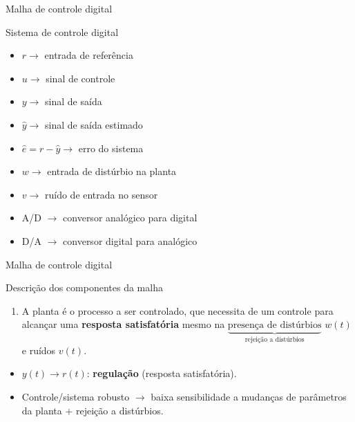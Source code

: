 \begin{frame}{Malha de controle digital}
\begin{block}{Sistema de controle digital}
\begin{itemize}
	\item $ r \rightarrow$ entrada de referência
	\item $ u \rightarrow$ sinal de controle
	\item $ y \rightarrow$ sinal de saída
	\item $ \hat{y} \rightarrow$ sinal de saída estimado
	\item $ \hat{e}=r-\hat{y} \rightarrow$ erro do sistema
	\item $ w \rightarrow$ entrada de distúrbio na planta
	\item $ v \rightarrow$ ruído de entrada no sensor
	\item A/D $ \rightarrow$ conversor analógico para digital
	\item D/A $ \rightarrow$ conversor digital para analógico
\end{itemize}
\end{block}
\end{frame}

\begin{frame}{Malha de controle digital}
\begin{block}{Descrição dos componentes da malha}
\begin{enumerate}
	\item A planta é o processo a ser controlado, que necessita de um controle para alcançar uma \textbf{resposta satisfatória} mesmo na $ \underbrace{\text{presença de distúrbios}}_{\text{rejeição a distúrbios}} $ $ w(t) $ e ruídos $ v(t) $.
\end{enumerate}

\vspace{0.5cm}

\begin{itemize}
	\item $ y(t)\to r(t) $: \textbf{regulação} (resposta satisfatória).
	\item Controle/sistema robusto $\rightarrow$ baixa sensibilidade a mudanças de parâmetros da planta $ + $ rejeição a distúrbios.
\end{itemize}
\end{block}
\end{frame}


